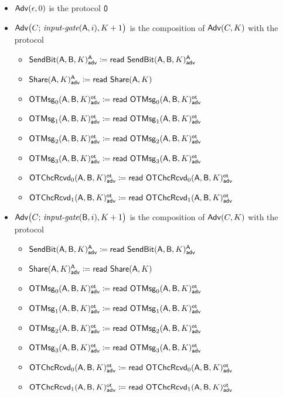 \begin{itemize}
\item $\Adv(\epsilon,0)$ is the protocol $\zero$

\item $\Adv\big(C; \, \inputgate(\A,i),K+1\big)$ is the composition of $\Adv(C,K)$ with the protocol
\begin{itemize}
\item {\color{blue} $\LeakSendBit(\A,\B,K)^\A_\adv \coloneqq \read{\LeakSendBit(\A,\B,K)^\A_\adv}$}
\item {\color{blue} $\LeakShare(\A,K)^\A_\adv \coloneqq \read{\Share(\A,K)}$}\smallskip
\item {\color{blue} $\LeakOTMsg_0(\A,\B,K)^\ot_\adv \coloneqq \read{\LeakOTMsg_0(\A,\B,K)^\ot_\adv}$}
\item {\color{blue} $\LeakOTMsg_1(\A,\B,K)^\ot_\adv \coloneqq \read{\LeakOTMsg_1(\A,\B,K)^\ot_\adv}$}
\item {\color{blue} $\LeakOTMsg_2(\A,\B,K)^\ot_\adv \coloneqq \read{\LeakOTMsg_2(\A,\B,K)^\ot_\adv}$}
\item {\color{blue} $\LeakOTMsg_3(\A,\B,K)^\ot_\adv \coloneqq \read{\LeakOTMsg_3(\A,\B,K)^\ot_\adv}$}\smallskip
\item {\color{blue} $\LeakOTChcRcvd_0(\A,\B,K)^\ot_\adv \coloneqq \read{\LeakOTChcRcvd_0(\A,\B,K)^\ot_\adv}$}
\item {\color{blue} $\LeakOTChcRcvd_1(\A,\B,K)^\ot_\adv \coloneqq \read{\LeakOTChcRcvd_1(\A,\B,K)^\ot_\adv}$}
\end{itemize}

\item $\Adv\big(C; \, \inputgate(\B,i),K+1\big)$ is the composition of $\Adv(C,K)$ with the protocol
\begin{itemize}
\item {\color{blue} $\LeakSendBit(\A,\B,K)^\A_\adv \coloneqq \read{\LeakSendBit(\A,\B,K)^\A_\adv}$}
\item {\color{blue} $\LeakShare(\A,K)^\A_\adv \coloneqq \read{\Share(\A,K)}$}\smallskip
\item {\color{blue} $\LeakOTMsg_0(\A,\B,K)^\ot_\adv \coloneqq \read{\LeakOTMsg_0(\A,\B,K)^\ot_\adv}$}
\item {\color{blue} $\LeakOTMsg_1(\A,\B,K)^\ot_\adv \coloneqq \read{\LeakOTMsg_1(\A,\B,K)^\ot_\adv}$}
\item {\color{blue} $\LeakOTMsg_2(\A,\B,K)^\ot_\adv \coloneqq \read{\LeakOTMsg_2(\A,\B,K)^\ot_\adv}$}
\item {\color{blue} $\LeakOTMsg_3(\A,\B,K)^\ot_\adv \coloneqq \read{\LeakOTMsg_3(\A,\B,K)^\ot_\adv}$}\smallskip
\item {\color{blue} $\LeakOTChcRcvd_0(\A,\B,K)^\ot_\adv \coloneqq \read{\LeakOTChcRcvd_0(\A,\B,K)^\ot_\adv}$}
\item {\color{blue} $\LeakOTChcRcvd_1(\A,\B,K)^\ot_\adv \coloneqq \read{\LeakOTChcRcvd_1(\A,\B,K)^\ot_\adv}$}
\end{itemize}


\end{itemize}
